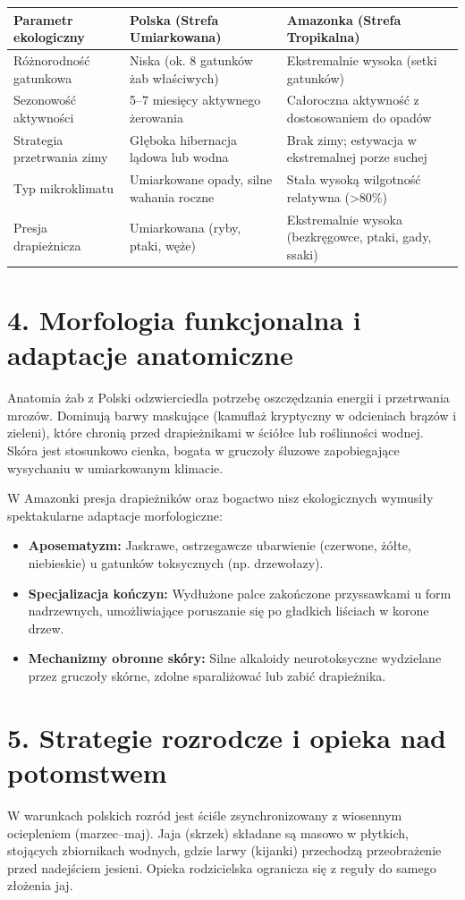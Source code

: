 \begin{tabularx}{\textwidth}{lXX}
\toprule
\textbf{Parametr ekologiczny} & \textbf{Polska (Strefa Umiarkowana)} & \textbf{Amazonka (Strefa Tropikalna)} \\
\midrule
Różnorodność gatunkowa & Niska (ok. 8 gatunków żab właściwych) & Ekstremalnie wysoka (setki gatunków) \\
Sezonowość aktywności & 5–7 miesięcy aktywnego żerowania & Całoroczna aktywność z dostosowaniem do opadów \\
Strategia przetrwania zimy & Głęboka hibernacja lądowa lub wodna & Brak zimy; estywacja w ekstremalnej porze suchej \\
Typ mikroklimatu & Umiarkowane opady, silne wahania roczne & Stała wysoką wilgotność relatywna (>80\%) \\
Presja drapieżnicza & Umiarkowana (ryby, ptaki, węże) & Ekstremalnie wysoka (bezkręgowce, ptaki, gady, ssaki) \\
\bottomrule
\end{tabularx}

\section*{4. Morfologia funkcjonalna i adaptacje anatomiczne}
Anatomia żab z Polski odzwierciedla potrzebę oszczędzania energii i przetrwania mrozów. Dominują barwy maskujące (kamuflaż kryptyczny w odcieniach brązów i zieleni), które chronią przed drapieżnikami w ściółce lub roślinności wodnej. Skóra jest stosunkowo cienka, bogata w gruczoły śluzowe zapobiegające wysychaniu w umiarkowanym klimacie.

W Amazonki presja drapieżników oraz bogactwo nisz ekologicznych wymusiły spektakularne adaptacje morfologiczne:
\begin{itemize}
\item \textbf{Aposematyzm:} Jaskrawe, ostrzegawcze ubarwienie (czerwone, żółte, niebieskie) u gatunków toksycznych (np. drzewołazy).
\item \textbf{Specjalizacja kończyn:} Wydłużone palce zakończone przyssawkami u form nadrzewnych, umożliwiające poruszanie się po gładkich liściach w korone drzew.
\item \textbf{Mechanizmy obronne skóry:} Silne alkaloidy neurotoksyczne wydzielane przez gruczoły skórne, zdolne sparaliżować lub zabić drapieżnika.
\end{itemize}

\section*{5. Strategie rozrodcze i opieka nad potomstwem}
W warunkach polskich rozród jest ściśle zsynchronizowany z wiosennym ociepleniem (marzec–maj). Jaja (skrzek) składane są masowo w płytkich, stojących zbiornikach wodnych, gdzie larwy (kijanki) przechodzą przeobrażenie przed nadejściem jesieni. Opieka rodzicielska ogranicza się z reguły do samego złożenia jaj.

